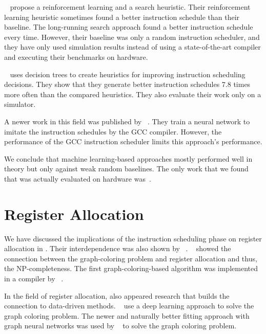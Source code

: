 \citeauthor{mcgovern1999scheduling}~\cite{mcgovern1999scheduling,mcgovern2002building} propose a reinforcement learning and a search heuristic.
Their reinforcement learning heuristic sometimes found a better instruction schedule than their baseline.
The long-running search approach found a better instruction schedule every time.
However, their baseline was only a random instruction scheduler, and they have only used simulation results instead of using a state-of-the-art compiler and executing their benchmarks on hardware.

\citeauthor{russell2006learning}~\cite{russell2006learning} uses decision trees to create heuristics for improving instruction scheduling decisions.
They show that they generate better instruction schedules 7.8 times more often than the compared heuristics.
They also evaluate their work only on a simulator.

A newer work in this field was published by \citeauthor{jain2019learning}~\cite{jain2019learning}.
They train a neural network to imitate the instruction schedules by the GCC compiler.
However, the performance of the GCC instruction scheduler limits this approach’s performance.

We conclude that machine learning-based approaches mostly performed well in theory but only against weak random baselines.
The only work that we found that was actually evaluated on hardware was~\cite{beaty1996using}.


\section{Register Allocation}
\label{sec:rw:register-allocation}
We have discussed the implications of the instruction scheduling phase on register allocation in .
Their interdependence was also shown by \citeauthor{goodman1988code}~\cite{goodman1988code}.
\citeauthor{lavrov1962store}~\cite{lavrov1962store} showed the connection between the graph-coloring problem and register allocation and thus, the NP-completeness.
The first graph-coloring-based algorithm was implemented in a compiler by \citeauthor{chaitin1982register}~\cite{chaitin1982register}.

In the field of register allocation, also appeared research that builds the connection to data-driven methods.
\citeauthor{das2019deep}~\cite{das2019deep} use a deep learning approach to solve the graph coloring problem.
The newer and naturally better fitting approach with graph neural networks was used by \citeauthor{lemos2019graph}~\cite{lemos2019graph} to solve the graph coloring problem. 

